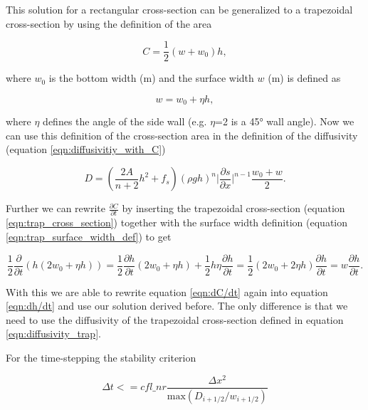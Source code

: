 \documentclass[journal abbreviation, manuscript]{copernicus}
\begin{document}
This solution for a rectangular cross-section can be generalized to a trapezoidal cross-section by using the definition of the area

\begin{equation}\label{eqn:trap_cross_section}
    C = \frac{1}{2}(w + w_0)h,
\end{equation}

\noindent where $w_0$ is the bottom width (m) and the surface width $w$ (m) is defined as

\begin{equation}\label{eqn:trap_surface_width_def}
    w = w_0 + \eta h,
\end{equation}

\noindent where $\eta$ defines the angle of the side wall (e.g. $\eta$=2 is a 45° wall angle). Now we can use this definition of the cross-section area in the definition of the diffusivity (equation \ref{eqn:diffusivitiy_with_C})

\begin{equation}\label{eqn:diffusivity_trap}
    D = \left(\frac{2 A}{n + 2} h^2 + f_s \right) (\rho g h)^n \lvert \frac{\partial s}{\partial x} \rvert^{n - 1} \frac{w_0 + w}{2}.
\end{equation}

\noindent Further we can rewrite $\frac{\partial C}{\partial t}$ by inserting the trapezoidal cross-section (equation \ref{eqn:trap_cross_section}) together with the surface width definition (equation \ref{eqn:trap_surface_width_def}) to get

\begin{equation}
    \frac{1}{2} \frac{\partial}{\partial t} (h(2w_0 + \eta h)) =  \frac{1}{2} \frac{\partial h}{\partial t}(2w_0 + \eta h) + \frac{1}{2} h \eta \frac{\partial h}{\partial t} = \frac{1}{2} (2w_0 + 2\eta h) \frac{\partial h}{\partial t} = w \frac{\partial h}{\partial t}.
\end{equation}

\noindent With this we are able to rewrite equation \ref{eqn:dC/dt} again into equation \ref{eqn:dh/dt} and use our solution derived before. The only difference is that we need to use the diffusivity of the trapezoidal cross-section defined in equation \ref{eqn:diffusivity_trap}.

For the time-stepping the stability criterion

\begin{equation}
\label{eqn:stability_criterion}
    \Delta t <= cfl\_nr \frac{\Delta x^2}{\mathrm{max}(D_{i+1/2}/w_{i+1/2})}
\end{equation}
\end{document}
